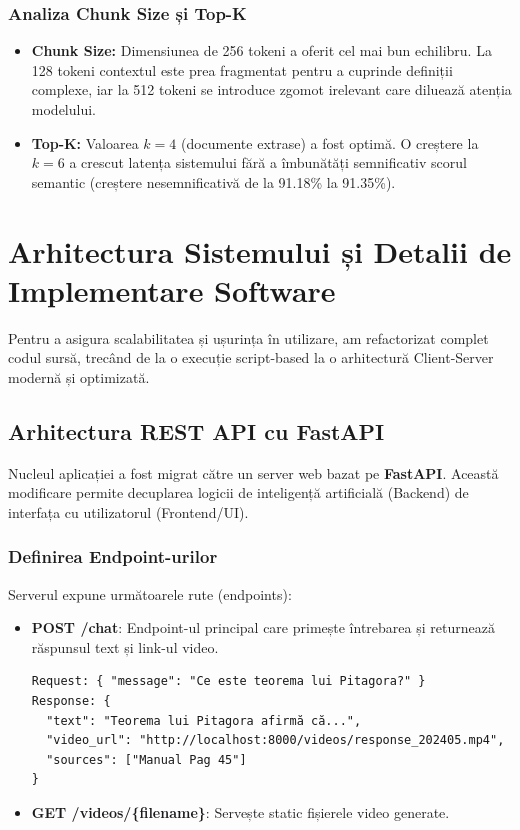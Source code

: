 \documentclass[12pt,a4paper]{report}
\begin{document}
\subsection{Analiza Chunk Size și Top-K}
\begin{itemize}
    \item \textbf{Chunk Size:} Dimensiunea de 256 tokeni a oferit cel mai bun echilibru. La 128 tokeni contextul este prea fragmentat pentru a cuprinde definiții complexe, iar la 512 tokeni se introduce zgomot irelevant care diluează atenția modelului.
    \item \textbf{Top-K:} Valoarea $k=4$ (documente extrase) a fost optimă. O creștere la $k=6$ a crescut latența sistemului fără a îmbunătăți semnificativ scorul semantic (creștere nesemnificativă de la 91.18\% la 91.35\%).
\end{itemize}

\chapter{Arhitectura Sistemului și Detalii de Implementare Software}

Pentru a asigura scalabilitatea și ușurința în utilizare, am refactorizat complet codul sursă, trecând de la o execuție script-based la o arhitectură Client-Server modernă și optimizată.

\section{Arhitectura REST API cu FastAPI}
Nucleul aplicației a fost migrat către un server web bazat pe \textbf{FastAPI}. Această modificare permite decuplarea logicii de inteligență artificială (Backend) de interfața cu utilizatorul (Frontend/UI).

\subsection{Definirea Endpoint-urilor}
Serverul expune următoarele rute (endpoints):

\begin{itemize}
    \item \textbf{POST /chat}: Endpoint-ul principal care primește întrebarea și returnează răspunsul text și link-ul video.
\begin{verbatim}
Request: { "message": "Ce este teorema lui Pitagora?" }
Response: { 
  "text": "Teorema lui Pitagora afirmă că...", 
  "video_url": "http://localhost:8000/videos/response_202405.mp4",
  "sources": ["Manual Pag 45"] 
}
\end{verbatim}
    \item \textbf{GET /videos/\{filename\}}: Servește static fișierele video generate.
\end{itemize}
\end{document}

